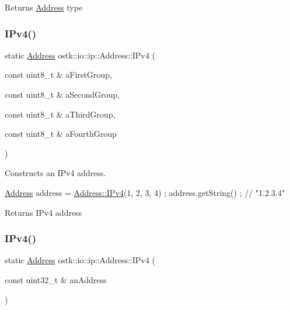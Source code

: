 \begin{DoxyReturn}{Returns}
\hyperlink{classostk_1_1io_1_1ip_1_1_address}{Address} type 
\end{DoxyReturn}
\mbox{\label{classostk_1_1io_1_1ip_1_1_address_a495956892a4815139c94377c0267125d}} 
\subsubsection{\texorpdfstring{I\+Pv4()}{IPv4()}\hspace{0.1cm}{\footnotesize\ttfamily [1/2]}}
{\footnotesize\ttfamily static \hyperlink{classostk_1_1io_1_1ip_1_1_address}{Address} ostk\+::io\+::ip\+::\+Address\+::\+I\+Pv4 (\begin{DoxyParamCaption}\item[{const uint8\+\_\+t \&}]{a\+First\+Group,  }\item[{const uint8\+\_\+t \&}]{a\+Second\+Group,  }\item[{const uint8\+\_\+t \&}]{a\+Third\+Group,  }\item[{const uint8\+\_\+t \&}]{a\+Fourth\+Group }\end{DoxyParamCaption})\hspace{0.3cm}{\ttfamily [static]}}



Constructs an I\+Pv4 address. 


\begin{DoxyCode}
\hyperlink{classostk_1_1io_1_1ip_1_1_address_a4118f42388b11fb003c9fb782f4ca04f}{Address} address = \hyperlink{classostk_1_1io_1_1ip_1_1_address_a495956892a4815139c94377c0267125d}{Address::IPv4}(1, 2, 3, 4) ;
address.getString() ; \textcolor{comment}{// "1.2.3.4"}
\end{DoxyCode}


\begin{DoxyReturn}{Returns}
I\+Pv4 address 
\end{DoxyReturn}
\mbox{\label{classostk_1_1io_1_1ip_1_1_address_abea1656b0c0edc9af3ba9b51a485a44b}} 
\subsubsection{\texorpdfstring{I\+Pv4()}{IPv4()}\hspace{0.1cm}{\footnotesize\ttfamily [2/2]}}
{\footnotesize\ttfamily static \hyperlink{classostk_1_1io_1_1ip_1_1_address}{Address} ostk\+::io\+::ip\+::\+Address\+::\+I\+Pv4 (\begin{DoxyParamCaption}\item[{const uint32\+\_\+t \&}]{an\+Address }\end{DoxyParamCaption})\hspace{0.3cm}{\ttfamily [static]}}



